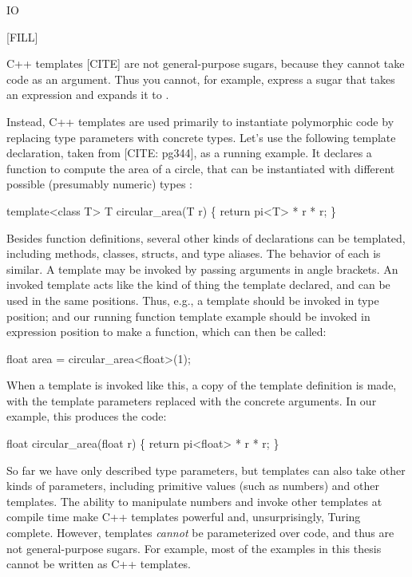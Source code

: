  IO

 [FILL]

 C++ templates [CITE] are not general-purpose sugars,
because they cannot take code as an argument. Thus you cannot, for
example, express a sugar that takes an expression  and expands
it to .

Instead, C++ templates are used
primarily to instantiate polymorphic code by replacing type parameters
with concrete types.  Let's use the following template declaration,
taken from [CITE: pg344], as a running example. It declares a function
to compute the area of a circle, that can be instantiated with
different possible (presumably numeric) types :
\begin{codes}
template<class T>
T circular_area(T r) \{
  return pi<T> * r * r;
\}
\end{codes}

Besides function definitions, several other kinds of declarations can
be templated, including methods, classes, structs, and type aliases.
The behavior of each is similar. A template may be invoked by passing
arguments in angle brackets. An invoked template acts like the
kind of thing the template declared, and can be used in the same
positions. Thus, e.g., a  template should be invoked in type
position; and our running function template example should be invoked
in expression position to make a function, which can then be called:
\begin{codes}
  float area = circular_area<float>(1);
\end{codes}
When a template is invoked like this, a copy of the template
definition is made, with the template parameters replaced with the
concrete arguments.
In our example, this produces the code:
\begin{codes}
float circular_area(float r) \{
  return pi<float> * r * r;
\}
\end{codes}

So far we have only described type parameters, but templates can also
take other kinds of parameters, including primitive values (such as
numbers) and other templates. The ability to manipulate numbers and
invoke other templates at compile time make C++ templates powerful
and, unsurprisingly, Turing complete. However, templates \emph{cannot}
be parameterized over code, and thus are not general-purpose sugars.
For example, most of the examples in this thesis cannot be written as
C++ templates.

